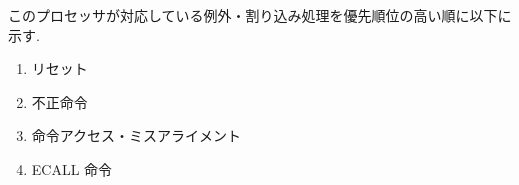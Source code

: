 \documentclass[../specifications.tex]{subfiles}
\begin{document}
  このプロセッサが対応している例外・割り込み処理を優先順位の高い順に以下に示す.
  \begin{enumerate}
    \item リセット
    \item 不正命令
    \item 命令アクセス・ミスアライメント
    \item ECALL 命令
  \end{enumerate}
\end{document}
